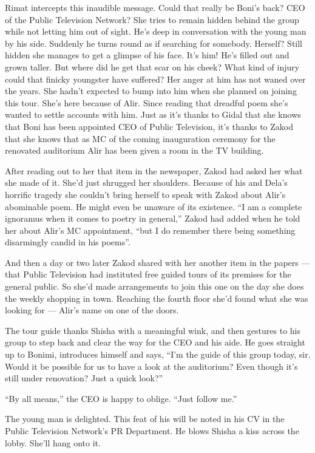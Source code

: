 \documentclass[twoside,11pt,openany]{book}
\begin{document}
Rimat intercepts this inaudible message. Could that really be Boni's back? CEO of the Public Television Network? She
tries to remain hidden behind the group
while not letting him out of sight. He's deep in conversation with the young man by his side.
Suddenly he turns round as if searching for somebody. Herself? Still hidden she manages to get a glimpse of his face.
It's him! He's filled out and grown taller. But where did he get that scar on his cheek? What kind of injury could
that finicky youngster have suffered? Her anger at him has not waned over the years. She hadn't expected to bump into
him when she planned on joining this tour{.} She's here because of
Alir.  Since reading that dreadful poem she's wanted to settle accounts with him. Just as it's thanks to Gidal that
she knows that Boni has been appointed CEO of Public Television, it's thanks to Zakod that she knows that as MC of
the coming{ }inauguration ceremony for the renovated auditorium Alir
has been given a room in the TV building.

After reading out to her that item in the newspaper, Zakod had asked her what she made of it. She'd just shrugged her
shoulders. Because of his and Dela's horrific tragedy she couldn't bring herself to speak with Zakod about Alir's
abominable poem. He might even be unaware of its existence. ``I am a complete ignoramus when it comes to
poetry in general,'' Zakod had added when he told her about Alir's MC appointment, ``but I
do remember there being something disarmingly candid in his poems''.

And then a day or two later Zakod shared with her another item in the papers --- that Public Television had instituted free
guided tours of its premises for the general public. So she'd made arrangements to join this one on the day she does
the weekly shopping in town. Reaching the fourth floor she'd found what she was looking for --- Alir's name on one of the
doors.

The tour guide thanks Shisha with a meaningful wink, and then gestures to his group to step back and clear the way for
the CEO and his aide. He goes straight up to Bonimi, introduces himself and
says, ``I'm the guide of
this group today, sir. Would it be possible for us to have a look at the auditorium? Even though it's still under
renovation? Just a quick look?''

``By all means,'' the CEO is happy to oblige. ``Just follow me.''

The young man is delighted. This feat of his will be noted in his CV in the Public Television Network's PR Department.
He blows Shisha a kiss across the lobby. She'll hang onto it.
\end{document}
